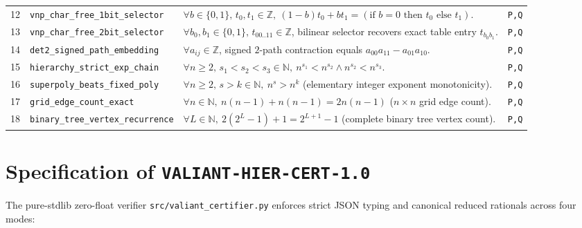 \documentclass[10pt,twocolumn]{article}
\newcommand{\ZZ}{\mathbb{Z}}
\newcommand{\NN}{\mathbb{N}}
\newcommand{\certschema}{\texttt{VALIANT-HIER-CERT-1.0}}
\begin{document}
\begin{table}[t]
\begin{tabular}{@{}r l p{10.6cm} l@{}}
12 & \texttt{vnp\_char\_free\_1bit\_selector} & $\forall b\in\{0,1\},\,t_0,t_1\in\ZZ,\ (1-b)t_0 + b t_1 = (\text{if } b=0 \text{ then } t_0 \text{ else } t_1)$. & \texttt{P,Q} \\
13 & \texttt{vnp\_char\_free\_2bit\_selector} & $\forall b_0,b_1\in\{0,1\},\,t_{00..11}\in\ZZ$, bilinear selector recovers exact table entry $t_{b_0 b_1}$. & \texttt{P,Q} \\
14 & \texttt{det2\_signed\_path\_embedding} & $\forall a_{ij}\in\ZZ$, signed $2$-path contraction equals $a_{00}a_{11}-a_{01}a_{10}$. & \texttt{P,Q} \\
15 & \texttt{hierarchy\_strict\_exp\_chain} & $\forall n\ge 2,\,s_1<s_2<s_3\in\NN,\ n^{s_1} < n^{s_2} \wedge n^{s_2} < n^{s_3}$. & \texttt{P,Q} \\
16 & \texttt{superpoly\_beats\_fixed\_poly} & $\forall n\ge 2,\,s > k\in\NN,\ n^s > n^k$ (elementary integer exponent monotonicity). & \texttt{P,Q} \\
17 & \texttt{grid\_edge\_count\_exact} & $\forall n\in\NN,\ n(n-1) + n(n-1) = 2n(n-1)$ ($n\times n$ grid edge count). & \texttt{P,Q} \\
18 & \texttt{binary\_tree\_vertex\_recurrence} & $\forall L\in\NN,\ 2(2^L-1) + 1 = 2^{L+1}-1$ (complete binary tree vertex count). & \texttt{P,Q} \\
\bottomrule
\end{tabular}
\end{table}

\section{Specification of \texorpdfstring{\certschema{}}{VALIANT-HIER-CERT-1.0}}\label{sec:cert}
The pure-stdlib zero-float verifier \texttt{src/valiant\_certifier.py} enforces strict JSON typing and canonical reduced rationals across four modes:
\end{document}
